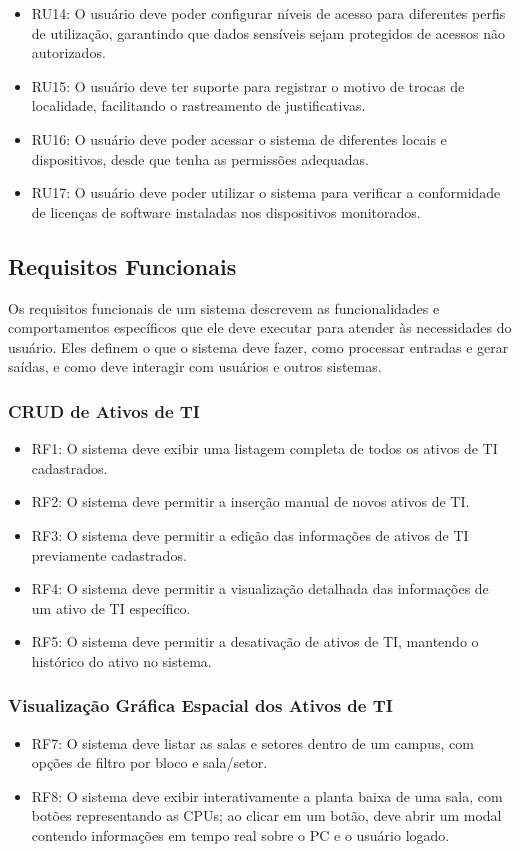 \begin{itemize}
    \item RU14: O usuário deve poder configurar níveis de acesso para diferentes perfis de utilização, garantindo que dados sensíveis sejam protegidos de acessos não autorizados.  
    \item RU15: O usuário deve ter suporte para registrar o motivo de trocas de localidade, facilitando o rastreamento de justificativas.  
    \item RU16: O usuário deve poder acessar o sistema de diferentes locais e dispositivos, desde que tenha as permissões adequadas.  
    \item RU17: O usuário deve poder utilizar o sistema para verificar a conformidade de licenças de software instaladas nos dispositivos monitorados.  
\end{itemize}


\subsection{Requisitos Funcionais}

Os requisitos funcionais de um sistema descrevem as funcionalidades e comportamentos específicos que ele deve executar para atender às necessidades do usuário. Eles definem o que o sistema deve fazer, como processar entradas e gerar saídas, e como deve interagir com usuários e outros sistemas.

\subsubsection{CRUD de Ativos de TI}
\begin{itemize}
    \item RF1: O sistema deve exibir uma listagem completa de todos os ativos de TI cadastrados.
    \item RF2: O sistema deve permitir a inserção manual de novos ativos de TI.
    \item RF3: O sistema deve permitir a edição das informações de ativos de TI previamente cadastrados.
    \item RF4: O sistema deve permitir a visualização detalhada das informações de um ativo de TI específico.
    \item RF5: O sistema deve permitir a desativação de ativos de TI, mantendo o histórico do ativo no sistema.
\end{itemize}

\subsubsection{Visualização Gráfica Espacial dos Ativos de TI}
\begin{itemize}
    \item RF7: O sistema deve listar as salas e setores dentro de um campus, com opções de filtro por bloco e sala/setor.
    \item RF8: O sistema deve exibir interativamente a planta baixa de uma sala, com botões representando as CPUs; ao clicar em um botão, deve abrir um modal contendo informações em tempo real sobre o PC e o usuário logado.
\end{itemize}

